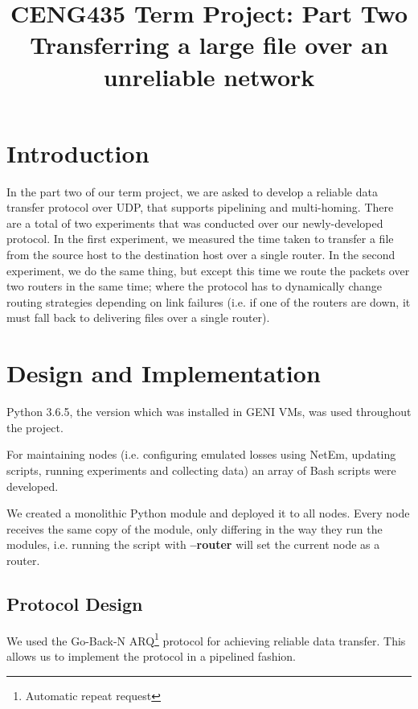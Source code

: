 \documentclass[conference]{IEEEtran}
\begin{document}
\title{%
  CENG435 Term Project: Part Two \\
  \large Transferring a large file over an unreliable network}

\author{
    \IEEEauthorblockA{}
\and
    \IEEEauthorblockA{}
}

\maketitle

\section{Introduction}
In the part two of our term project, we are asked to develop a reliable data transfer protocol
over UDP, that supports pipelining and multi-homing. There are a total of two experiments that
was conducted over our newly-developed protocol. In the first experiment, we measured the time
taken to transfer a file from the source host to the destination host over a single router. In
the second experiment, we do the same thing, but except this time we route the packets over two
routers in the same time; where the protocol has to dynamically change routing strategies
depending on link failures (i.e. if one of the routers are down, it must fall back to delivering
files over a single router).

\section{Design and Implementation}
Python 3.6.5, the version which was installed in GENI VMs, was used throughout the project.

For maintaining nodes (i.e. configuring emulated losses using NetEm, updating scripts, running
experiments and collecting data) an array of Bash scripts were developed.

We created a monolithic Python module and deployed it to all nodes. Every node receives the same
copy of the module, only differing in the way they run the modules, i.e. running the script with
\textbf{--router} will set the current node as a router.


\subsection{Protocol Design}
We used the Go-Back-N ARQ\footnote{Automatic repeat request} protocol for achieving reliable data transfer.
This allows us to implement the protocol in a pipelined fashion.
\end{document}
